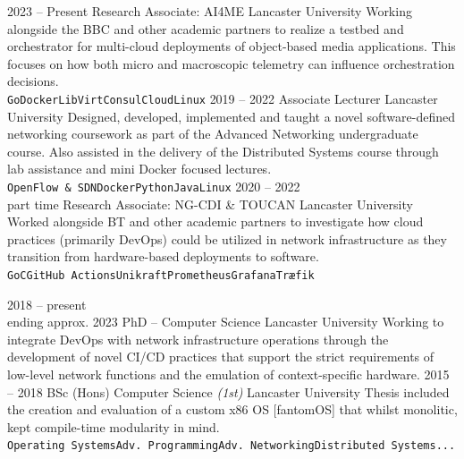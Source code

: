 \documentclass[9pt]{developercv} %
\begin{document}
\begin{entrylist}
	\entry
	{2023 -- Present}
	{Research Associate: AI4ME}
	{Lancaster University}
	{Working alongside the BBC and other academic partners to realize a testbed
		and orchestrator for multi-cloud deployments of object-based media
		applications. This focuses on how both micro and macroscopic telemetry can
		influence orchestration decisions.\\
		\texttt{Go}\slashsep\texttt{Docker}\slashsep\texttt{LibVirt}\slashsep\texttt{Consul}\slashsep\texttt{Cloud}\slashsep\texttt{Linux}}
	\entry
	{2019 -- 2022}
	{Associate Lecturer}
	{Lancaster University}
	{Designed, developed, implemented and taught a novel software-defined
		networking coursework as part of the Advanced Networking undergraduate course.
		Also assisted in the delivery of the Distributed Systems course through lab
		assistance and mini Docker focused lectures.
		\\
		\texttt{OpenFlow \& SDN}\slashsep\texttt{Docker}\slashsep\texttt{Python}\slashsep\texttt{Java}\slashsep\texttt{Linux}}
	\entry
	{2020 -- 2022\\\footnotesize{part time}}
	{Research Associate: NG-CDI \& TOUCAN}
	{Lancaster University}
	{Worked alongside BT and other academic partners to investigate how cloud
		practices (primarily DevOps) could be utilized in network infrastructure as
		they transition from hardware-based deployments to software.\\
		\texttt{Go}\slashsep\texttt{C}\slashsep\texttt{GitHub Actions}\slashsep\texttt{Unikraft}\slashsep\texttt{Prometheus}\slashsep\texttt{Grafana}\slashsep\texttt{Træfik}}
\end{entrylist}


\vspace{-1em}

\begin{entrylist}
	\entry
	{2018 -- present\\\footnotesize{ending approx. 2023}}
	{PhD -- Computer Science}
	{Lancaster University}
	{Working to integrate DevOps with network infrastructure operations through the
		development of novel CI/CD practices that support the strict requirements of
		low-level network functions and the emulation of context-specific hardware.}
	\entry
	{2015 -- 2018}
	{BSc (Hons) Computer Science \textit{(1st)}}
	{Lancaster University}
	{Thesis included the creation and evaluation of a custom x86 OS [fantomOS] that whilst
		monolitic, kept compile-time modularity in
		mind.\\\texttt{Operating Systems}\slashsep\texttt{Adv.
			Programming}\slashsep\texttt{Adv. Networking}\slashsep\texttt{Distributed Systems}\slashsep\texttt{...}}
\end{entrylist}
\end{document}
